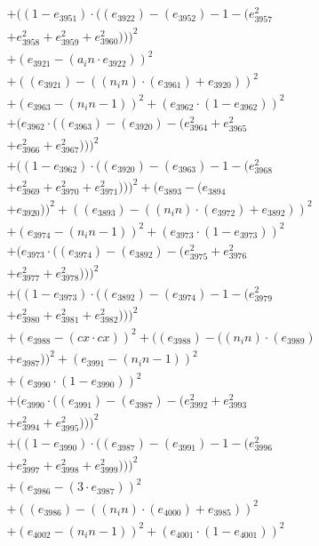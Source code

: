 \documentclass[10pt, a4paper]{article}
\begin{document}
\begin{align*}
& + ((1 - e_{3951})  \cdot  ((e_{3922}) - (e_{3952}) - 1 - (e_{3957}^{2} \\
& + e_{3958}^{2} + e_{3959}^{2} + e_{3960}^{2})))^{2} \\
& + (e_{3921} - (a_in  \cdot  e_{3922}))^{2} \\
& + ((e_{3921}) - ((n_in)  \cdot  (e_{3961}) + e_{3920}))^{2} \\
& + (e_{3963} - (n_in - 1))^{2} + (e_{3962}  \cdot  (1 - e_{3962}))^{2} \\
& + (e_{3962}  \cdot  ((e_{3963}) - (e_{3920}) - (e_{3964}^{2} + e_{3965}^{2} \\
& + e_{3966}^{2} + e_{3967}^{2})))^{2} \\
& + ((1 - e_{3962})  \cdot  ((e_{3920}) - (e_{3963}) - 1 - (e_{3968}^{2} \\
& + e_{3969}^{2} + e_{3970}^{2} + e_{3971}^{2})))^{2} + (e_{3893} - (e_{3894} \\
& + e_{3920}))^{2} + ((e_{3893}) - ((n_in)  \cdot  (e_{3972}) + e_{3892}))^{2} \\
& + (e_{3974} - (n_in - 1))^{2} + (e_{3973}  \cdot  (1 - e_{3973}))^{2} \\
& + (e_{3973}  \cdot  ((e_{3974}) - (e_{3892}) - (e_{3975}^{2} + e_{3976}^{2} \\
& + e_{3977}^{2} + e_{3978}^{2})))^{2} \\
& + ((1 - e_{3973})  \cdot  ((e_{3892}) - (e_{3974}) - 1 - (e_{3979}^{2} \\
& + e_{3980}^{2} + e_{3981}^{2} + e_{3982}^{2})))^{2} \\
& + (e_{3988} - (cx  \cdot  cx))^{2} + ((e_{3988}) - ((n_in)  \cdot  (e_{3989}) \\
& + e_{3987}))^{2} + (e_{3991} - (n_in - 1))^{2} \\
& + (e_{3990}  \cdot  (1 - e_{3990}))^{2} \\
& + (e_{3990}  \cdot  ((e_{3991}) - (e_{3987}) - (e_{3992}^{2} + e_{3993}^{2} \\
& + e_{3994}^{2} + e_{3995}^{2})))^{2} \\
& + ((1 - e_{3990})  \cdot  ((e_{3987}) - (e_{3991}) - 1 - (e_{3996}^{2} \\
& + e_{3997}^{2} + e_{3998}^{2} + e_{3999}^{2})))^{2} \\
& + (e_{3986} - (3  \cdot  e_{3987}))^{2} \\
& + ((e_{3986}) - ((n_in)  \cdot  (e_{4000}) + e_{3985}))^{2} \\
& + (e_{4002} - (n_in - 1))^{2} + (e_{4001}  \cdot  (1 - e_{4001}))^{2} \\

\end{align*}
\end{document}
